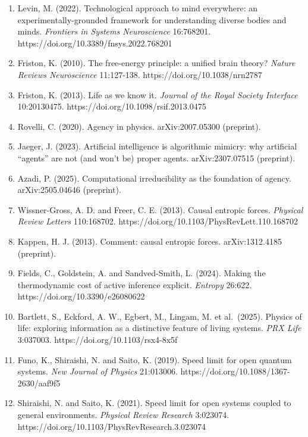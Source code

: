 \documentclass[
  10pt,
]{article}
\begin{document}
\begin{enumerate}
  Barandiaran, X. E. and Almendros, L. S. (2024). Transforming agency:
  on the mode of existence of large language models. arXiv:2407.10735
  (preprint).
\item
  Levin, M. (2022). Technological approach to mind everywhere: an
  experimentally-grounded framework for understanding diverse bodies and
  minds. \emph{Frontiers in Systems Neuroscience} 16:768201.
  https://doi.org/10.3389/fnsys.2022.768201
\item
  Friston, K. (2010). The free-energy principle: a unified brain theory?
  \emph{Nature Reviews Neuroscience} 11:127-138.
  https://doi.org/10.1038/nrn2787
\item
  Friston, K. (2013). Life as we know it. \emph{Journal of the Royal
  Society Interface} 10:20130475. https://doi.org/10.1098/rsif.2013.0475
\item
  Rovelli, C. (2020). Agency in physics. arXiv:2007.05300 (preprint).
\item
  Jaeger, J. (2023). Artificial intelligence is algorithmic mimicry: why
  artificial ``agents'' are not (and won't be) proper agents.
  arXiv:2307.07515 (preprint).
\item
  Azadi, P. (2025). Computational irreducibility as the foundation of
  agency. arXiv:2505.04646 (preprint).
\item
  Wissner-Gross, A. D. and Freer, C. E. (2013). Causal entropic forces.
  \emph{Physical Review Letters} 110:168702.
  https://doi.org/10.1103/PhysRevLett.110.168702
\item
  Kappen, H. J. (2013). Comment: causal entropic forces. arXiv:1312.4185
  (preprint).
\item
  Fields, C., Goldstein, A. and Sandved-Smith, L. (2024). Making the
  thermodynamic cost of active inference explicit. \emph{Entropy}
  26:622. https://doi.org/10.3390/e26080622
\item
  Bartlett, S., Eckford, A. W., Egbert, M., Lingam, M. et al.~(2025).
  Physics of life: exploring information as a distinctive feature of
  living systems. \emph{PRX Life} 3:037003.
  https://doi.org/10.1103/rsx4-8x5f
\item
  Funo, K., Shiraishi, N. and Saito, K. (2019). Speed limit for open
  quantum systems. \emph{New Journal of Physics} 21:013006.
  https://doi.org/10.1088/1367-2630/aaf9f5
\item
  Shiraishi, N. and Saito, K. (2021). Speed limit for open systems
  coupled to general environments. \emph{Physical Review Research}
  3:023074. https://doi.org/10.1103/PhysRevResearch.3.023074

\end{enumerate}
\end{document}
